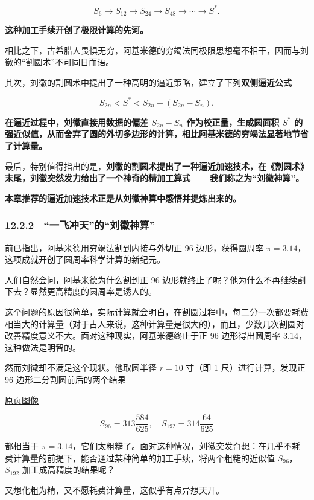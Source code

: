 \documentclass[
  10pt,
  fontset=fandol]{ctexart}
\begin{document}
\[
S_6\to S_{12}\to S_{24}\to S_{48}\to\cdots\to S^*.
\]

\textbf{这种加工手续开创了极限计算的先河。}

相比之下，古希腊人畏惧无穷，阿基米德的穷竭法同极限思想毫不相干，因而与刘徽的``割圆术''不可同日而语。

其次，刘徽的割圆术中提出了一种高明的逼近策略，建立了下列\textbf{双侧逼近公式}

\[
S_{2n}<S^*<S_{2n}+(S_{2n}-S_n).
\]

\textbf{在逼近过程中，刘徽直接用数据的偏差 \(S_{2n}-S_n\) 作为校正量，生成圆面积 \(S^*\) 的强近似值，从而舍弃了圆的外切多边形的计算，相比阿基米德的穷竭法显著地节省了计算量。}

最后，特别值得指出的是，\textbf{刘徽的割圆术提出了一种逼近加速技术，在《割圆术》末尾，刘徽突然发力给出了一个神奇的精加工算式------我们称之为``刘徽神算''。}

\textbf{本章推荐的逼近加速技术正是从刘徽神算中感悟并提炼出来的。}

\subsubsection{12.2.2　``一飞冲天''的``刘徽神算''}\label{ux4e00ux98deux51b2ux5929ux7684ux5218ux5fbdux795eux7b97}

前已指出，阿基米德用穷竭法割到内接与外切正 96 边形，获得圆周率 \(\pi=3.14\)，这项成就开创了圆周率科学计算的新纪元。

人们自然会问，阿基米德为什么割到正 96 边形就终止了呢？他为什么不再继续割下去？显然更高精度的圆周率是诱人的。

这个问题的原因很简单，实际计算就会明白，在割圆过程中，每二分一次都要耗费相当大的计算量（对于古人来说，这种计算量是很大的），而且，少数几次割圆对改善精度意义不大。面对这种现实，阿基米德终止于正 96 边形得出圆周率 3.14，这种做法是明智的。

然而刘徽却不满足这个现状。他取圆半径 \(r=10\) 寸（即 1 尺）进行计算，发现正 96 边形二分割圆前后的两个结果

\href{../../source-images/pdf-297.jpeg}{原页图像}

\[
S_{96}=313\frac{584}{625},\quad S_{192}=314\frac{64}{625}
\]

都相当于 \(\pi=3.14\)，它们太粗糙了。面对这种情况，刘徽突发奇想：在几乎不耗费计算量的前提下，能否通过某种简单的加工手续，将两个粗糙的近似值 \(S_{96}\)，\(S_{192}\) 加工成高精度的结果呢？

又想化粗为精，又不愿耗费计算量，这似乎有点异想天开。
\end{document}
